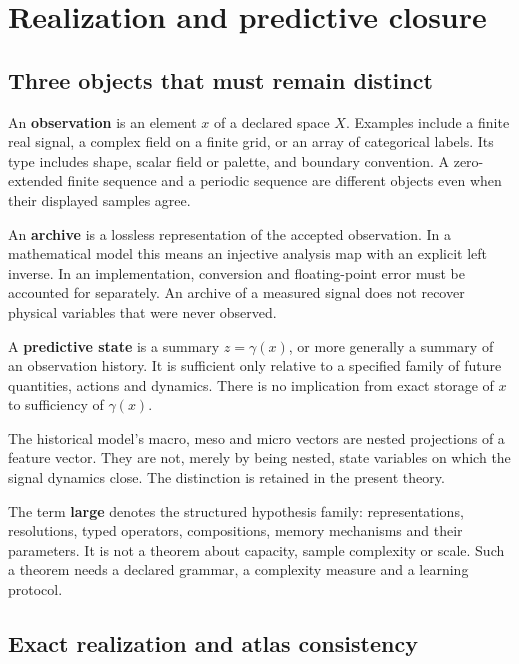 
\chapter{Realization and predictive closure}\label{LSM:book:chapter-31}
\section{Three objects that must remain distinct}\label{LSM:three-objects-that-must-remain-distinct}

An \textbf{observation} is an element \(x\) of a declared space \(X\).
Examples include a finite real signal, a complex field on a finite grid,
or an array of categorical labels. Its type includes shape, scalar field
or palette, and boundary convention. A zero-extended finite sequence and
a periodic sequence are different objects even when their displayed
samples agree.

An \textbf{archive} is a lossless representation of the accepted
observation. In a mathematical model this means an injective analysis
map with an explicit left inverse. In an implementation, conversion and
floating-point error must be accounted for separately. An archive of a
measured signal does not recover physical variables that were never
observed.

A \textbf{predictive state} is a summary \(z=\gamma(x)\), or more
generally a summary of an observation history. It is sufficient only
relative to a specified family of future quantities, actions and
dynamics. There is no implication from exact storage of \(x\) to
sufficiency of \(\gamma(x)\).

The historical model's macro, meso and micro vectors are nested
projections of a feature vector. They are not, merely by being nested,
state variables on which the signal dynamics close. The distinction is
retained in the present theory.

The term \textbf{large} denotes the structured hypothesis family:
representations, resolutions, typed operators, compositions, memory
mechanisms and their parameters. It is not a theorem about capacity,
sample complexity or scale. Such a theorem needs a declared grammar, a
complexity measure and a learning protocol.

\section{Exact realization and atlas consistency}\label{LSM:exact-realization-and-atlas-consistency}

